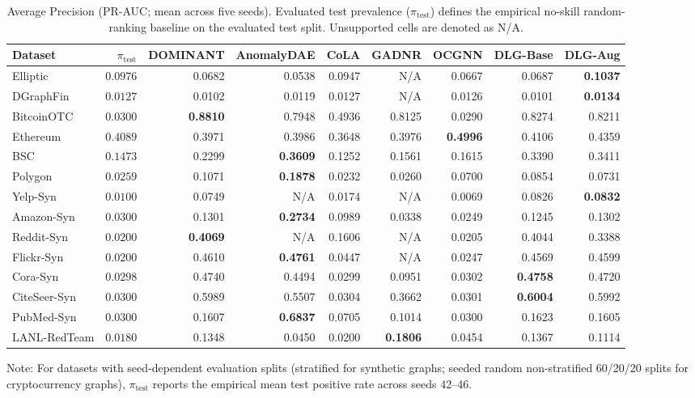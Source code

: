\documentclass[11pt,a4paper]{article}
\begin{document}
\begin{table}[htbp]
\centering\footnotesize\setlength{\tabcolsep}{1.8pt}
\caption{Average Precision (PR-AUC; mean across five seeds). Evaluated test prevalence ($\pi_{\mathrm{test}}$) defines the empirical no-skill random-ranking baseline on the evaluated test split. Unsupported cells are denoted as N/A.}
\label{tab:pr_auc_main}
\begin{tabular*}{\textwidth}{@{\extracolsep{\fill}}lrrrrrrrr}\toprule
\textbf{Dataset} & $\pi_{\mathrm{test}}$ & \textbf{DOMINANT} & \textbf{AnomalyDAE} & \textbf{CoLA} & \textbf{GADNR} & \textbf{OCGNN} & \textbf{DLG-Base} & \textbf{DLG-Aug} \\\midrule
Elliptic & $0.0976$ & 0.0682 & 0.0538 & 0.0947 & N/A & 0.0667 & 0.0687 & \textbf{0.1037} \\
DGraphFin & $0.0127$ & 0.0102 & 0.0119 & 0.0127 & N/A & 0.0126 & 0.0101 & \textbf{0.0134} \\
BitcoinOTC & $0.0300$ & \textbf{0.8810} & 0.7948 & 0.4936 & 0.8125 & 0.0290 & 0.8274 & 0.8211 \\
Ethereum & $0.4089$ & 0.3971 & 0.3986 & 0.3648 & 0.3976 & \textbf{0.4996} & 0.4106 & 0.4359 \\
BSC & $0.1473$ & 0.2299 & \textbf{0.3609} & 0.1252 & 0.1561 & 0.1615 & 0.3390 & 0.3411 \\
Polygon & $0.0259$ & 0.1071 & \textbf{0.1878} & 0.0232 & 0.0260 & 0.0700 & 0.0854 & 0.0731 \\
Yelp-Syn & $0.0100$ & 0.0749 & N/A & 0.0174 & N/A & 0.0069 & 0.0826 & \textbf{0.0832} \\
Amazon-Syn & $0.0300$ & 0.1301 & \textbf{0.2734} & 0.0989 & 0.0338 & 0.0249 & 0.1245 & 0.1302 \\
Reddit-Syn & $0.0200$ & \textbf{0.4069} & N/A & 0.1606 & N/A & 0.0205 & 0.4044 & 0.3388 \\
Flickr-Syn & $0.0200$ & 0.4610 & \textbf{0.4761} & 0.0447 & N/A & 0.0247 & 0.4569 & 0.4599 \\
Cora-Syn & $0.0298$ & 0.4740 & 0.4494 & 0.0299 & 0.0951 & 0.0302 & \textbf{0.4758} & 0.4720 \\
CiteSeer-Syn & $0.0300$ & 0.5989 & 0.5507 & 0.0304 & 0.3662 & 0.0301 & \textbf{0.6004} & 0.5992 \\
PubMed-Syn & $0.0300$ & 0.1607 & \textbf{0.6837} & 0.0705 & 0.1014 & 0.0300 & 0.1623 & 0.1605 \\\midrule
LANL-RedTeam & $0.0180$ & 0.1348 & 0.0450 & 0.0200 & \textbf{0.1806} & 0.0454 & 0.1367 & 0.1114 \\\bottomrule
\end{tabular*}
\begin{tablenotes}\footnotesize
\item Note: For datasets with seed-dependent evaluation splits (stratified for synthetic graphs; seeded random non-stratified 60/20/20 splits for cryptocurrency graphs), $\pi_{\mathrm{test}}$ reports the empirical mean test positive rate across seeds 42--46.
\end{tablenotes}
\end{table}
\end{document}

